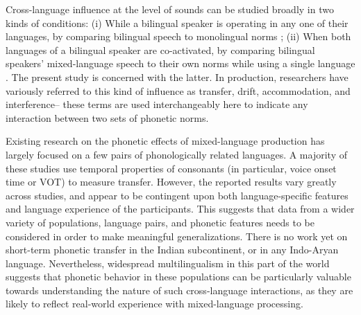 \documentclass[charis,linguex]{glossa}
\begin{document}
Cross-language influence at the level of sounds can be studied broadly in two kinds of conditions:
(i) While a bilingual speaker is operating in any one of their languages, by comparing bilingual speech to monolingual norms \citep[e.g.][]{guion2003vowel,caramazza1973acquisition,flege1987production}; %
(ii) When both languages of a bilingual speaker are co-activated, by comparing bilingual speakers' mixed-language speech to their own norms while using a single language \citep[e.g.][]{grosjean1994going, bullock2009trying,elias2017effects, simonet2014phonetic}. %
The present study is concerned with the latter. In production, researchers have variously referred to this kind of influence as transfer, drift, accommodation, and interference-- these terms are used interchangeably here to indicate any interaction between two sets of phonetic norms.

Existing research on the phonetic effects of mixed-language production has largely focused on a few pairs of phonologically related languages. A majority of these studies use temporal properties of consonants (in particular, voice onset time or VOT) to measure transfer. However, the reported results vary greatly across studies, and appear to be contingent upon both language-specific features and language experience of the participants. This suggests that data from a wider variety of
populations, language pairs,  and phonetic features needs to be considered in order to make meaningful generalizations. There is no work yet on short-term phonetic transfer in the Indian subcontinent, or in any Indo-Aryan language. Nevertheless, widespread multilingualism in this part of the world suggests that phonetic
behavior in these populations can be particularly valuable towards understanding the nature of such cross-language interactions, as they are likely to reflect real-world experience with mixed-language processing.\\
\end{document}
